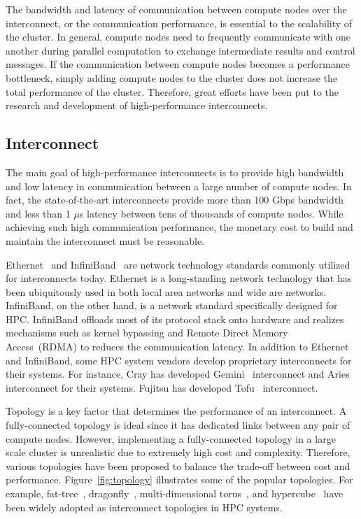 The bandwidth and latency of communication between compute nodes over the
interconnect, or the communication performance, is essential to the
scalability of the cluster. In general, compute nodes need to frequently
communicate with one another during parallel computation to exchange
intermediate results and control messages. If the communication between
compute nodes becomes a performance bottleneck, simply adding compute nodes to
the cluster does not increase the total performance of the cluster. Therefore,
great efforts have been put to the research and development of
high-performance interconnects.

\subsection{Interconnect}\label{sec:i-interconnect}

The main goal of high-performance interconnects is to provide high bandwidth
and low latency in communication between a large number of compute nodes.
In fact, the state-of-the-art interconnects provide more than 100 Gbps
bandwidth and less than 1 $\mu$s latency between tens of thousands of compute
nodes. While achieving such high communication performance, the monetary cost
to build and maintain the interconnect must be reasonable.

Ethernet~\autocite{Trowbridge2007} and InfiniBand~\autocite{Buyya2009} are
network technology standards commonly utilized for interconnects today.
Ethernet is a long-standing network technology that has been ubiquitously used
in both local area networks and wide are networks. InfiniBand, on the other
hand, is a network standard specifically designed for HPC\@. InfiniBand
offloads most of its protocol stack onto hardware and realizes mechanisms such
as kernel bypassing and Remote Direct Memory Access~(RDMA) to reduces the
communication latency. In addition to Ethernet and InfiniBand, some HPC system
vendors develop proprietary interconnects for their systems. For instance,
Cray has developed Gemini~\autocite{Alverson2010} interconnect and
Aries~\autocite{Faanes2012} interconnect for their systems. Fujitsu has
developed Tofu~\autocite{Ajima2012} interconnect.

Topology is a key factor that determines the performance of an interconnect.
A fully-connected topology is ideal since it has dedicated links between any
pair of compute nodes. However, implementing a fully-connected topology in a
large scale cluster is unrealistic due to extremely high cost and complexity.
Therefore, various topologies have been proposed to balance the trade-off
between cost and performance. Figure~\ref{fig:topology} illustrates some of
the popular topologies. For example, fat-tree~\autocite{Leiserson1985},
dragonfly~\autocite{Kim2008}, multi-dimensional
torus~\autocite{Alverson2010,Ajima2012}, and hypercube~\autocite{Dally2003} have
been widely adopted as interconnect topologies in HPC systems.

